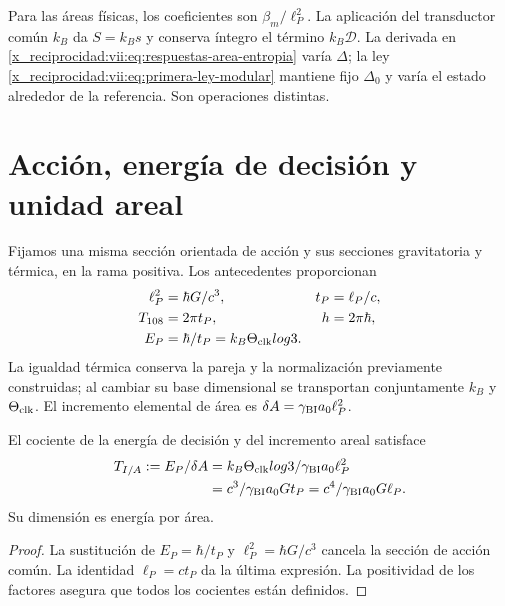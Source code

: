 Para las áreas físicas, los coeficientes son \(\beta_m/\ell_P^2\).
La aplicación del transductor común \(k_B\) da \(S=k_Bs\) y
conserva íntegro el término \(k_B\mathcal D\). La derivada en
\eqref{x_reciprocidad:vii:eq:respuestas-area-entropia} varía \(\Delta\); la ley
\eqref{x_reciprocidad:vii:eq:primera-ley-modular} mantiene fijo \(\Delta_0\) y
varía el estado alrededor de la referencia. Son operaciones distintas.

\section{Acción, energía de decisión y unidad areal}
\label{x_reciprocidad:vii:subsec:conversion-informacion-area}

Fijamos una misma sección orientada de acción y sus secciones gravitatoria
y térmica, en la rama positiva. Los antecedentes proporcionan
\begin{equation}
 \begin{aligned}
 \ell_P^2&=\frac{\hbar G}{c^3},& t_P&=\frac{\ell_P}{c},\\
 T_{108}&=2\pi t_P,& h&=2\pi\hbar,\\
 E_P&=\frac{\hbar}{t_P}=k_B\Theta_{\rm clk}\log3.&&
 \end{aligned}
 \label{x_reciprocidad:vii:eq:unidad-accion-informacion}
\end{equation}
La igualdad térmica conserva la pareja y la normalización previamente
construidas; al cambiar su base dimensional se transportan conjuntamente
\(k_B\) y \(\Theta_{\rm clk}\). El incremento elemental de área es
\(\delta\mathcal A=\gamma_{\rm BI}a_0\ell_P^2\).

\begin{proposition}
\label{x_reciprocidad:vii:prop:tension-informacion-area}
El cociente de la energía de decisión y del incremento areal satisface
\begin{equation}
 \begin{aligned}
 \mathcal T_{I/A}:=\frac{E_P}{\delta\mathcal A}
 &=\frac{k_B\Theta_{\rm clk}\log3}{\gamma_{\rm BI}a_0\ell_P^2}\\
 &=\frac{c^3}{\gamma_{\rm BI}a_0G t_P}
  =\frac{c^4}{\gamma_{\rm BI}a_0G\ell_P}.
 \end{aligned}
 \label{x_reciprocidad:vii:eq:tension-informacion-area}
\end{equation}
Su dimensión es energía por área.
\end{proposition}
\begin{proof}
La sustitución de \(E_P=\hbar/t_P\) y
\(\ell_P^2=\hbar G/c^3\) cancela la sección de acción común.
La identidad \(\ell_P=ct_P\) da la última expresión. La positividad
de los factores asegura que todos los cocientes están definidos.
\end{proof}


